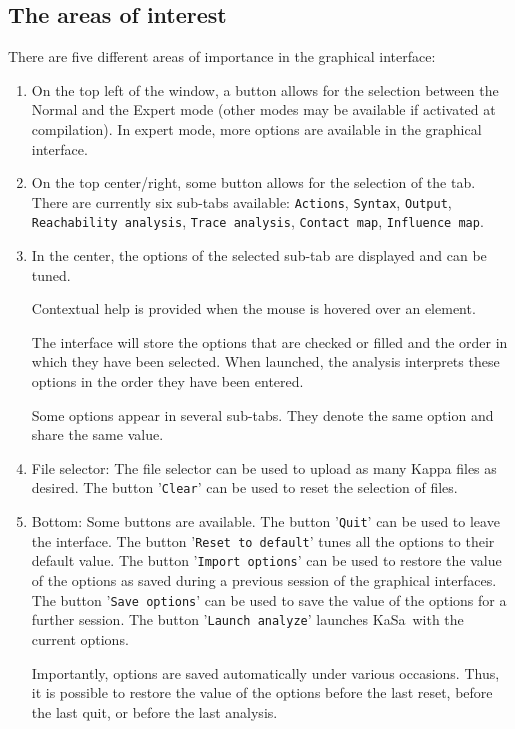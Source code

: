 \documentclass[11pt]{book}
\def\KaSa{\textsf{KaSa}}
\begin{document}
\subsection{The areas of interest}

There are five different areas of importance in the graphical interface:
\begin{enumerate}
\item On the top left of the window, a button allows for the selection between the Normal and the Expert mode (other modes may be available if activated at compilation).
In expert mode, more options are available in the graphical interface.
\item On the top center/right, some button allows for the selection of the tab. There are currently six sub-tabs available: \texttt{Actions}, \texttt{Syntax}, \texttt{Output}, \texttt{Reachability analysis}, \texttt{Trace analysis}, \texttt{Contact map}, \texttt{Influence map}.

\item In the center, the options of the selected sub-tab are displayed and can be tuned.

Contextual help is provided when the mouse is hovered over an element.

The interface will store the options that are checked or filled and the order in which they have been selected.
When launched, the analysis interprets these options in the order they have been entered.

Some options appear in several sub-tabs. They denote the same option and share the same value.

\item File selector: The file selector can be used to upload as many Kappa files as desired. The button '\texttt{Clear}' can be used to reset the selection of files.
\item Bottom: Some buttons are available. The button '\texttt{Quit}' can be used to leave the interface. The button '\texttt{Reset to default}' tunes all the options to their default value. The button '\texttt{Import options}' can be used to restore the value of the options as saved during a previous session of the graphical interfaces. The button '\texttt{Save options}' can be used to save the value of the options for a further session. The button '\texttt{Launch analyze}' launches \KaSa\ with the current options.

Importantly, options are saved automatically under various occasions. Thus, it is possible to restore the value of the options
before the last reset, before the last quit, or before the last analysis.
\end{enumerate}
\end{document}
